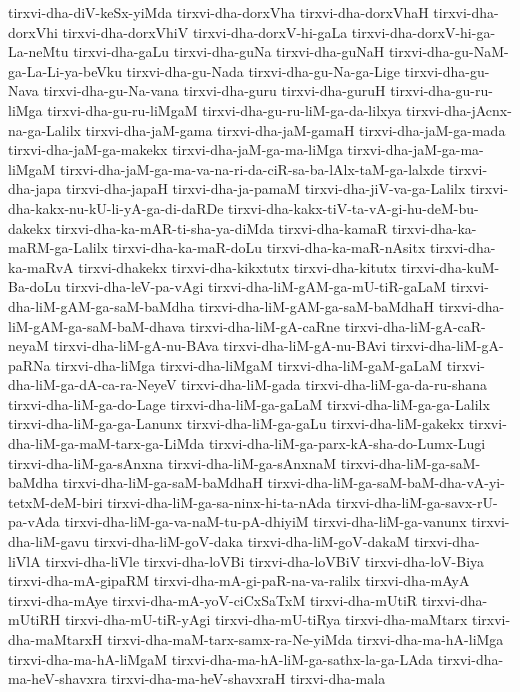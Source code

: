{tirxvi-dha-diV-keSx-yiMda
tirxvi-dha-dorxVha
tirxvi-dha-dorxVhaH
tirxvi-dha-dorxVhi
tirxvi-dha-dorxVhiV
tirxvi-dha-dorxV-hi-gaLa
tirxvi-dha-dorxV-hi-ga-La-neMtu
tirxvi-dha-gaLu
tirxvi-dha-guNa
tirxvi-dha-guNaH
tirxvi-dha-gu-NaM-ga-La-Li-ya-beVku
tirxvi-dha-gu-Nada
tirxvi-dha-gu-Na-ga-Lige
tirxvi-dha-gu-Nava
tirxvi-dha-gu-Na-vana
tirxvi-dha-guru
tirxvi-dha-guruH
tirxvi-dha-gu-ru-liMga
tirxvi-dha-gu-ru-liMgaM
tirxvi-dha-gu-ru-liM-ga-da-lilxya
tirxvi-dha-jAcnx-na-ga-Lalilx
tirxvi-dha-jaM-gama
tirxvi-dha-jaM-gamaH
tirxvi-dha-jaM-ga-mada
tirxvi-dha-jaM-ga-makekx
tirxvi-dha-jaM-ga-ma-liMga
tirxvi-dha-jaM-ga-ma-liMgaM
tirxvi-dha-jaM-ga-ma-va-na-ri-da-ciR-sa-ba-lAlx-taM-ga-lalxde
tirxvi-dha-japa
tirxvi-dha-japaH
tirxvi-dha-ja-pamaM
tirxvi-dha-jiV-va-ga-Lalilx
tirxvi-dha-kakx-nu-kU-li-yA-ga-di-daRDe
tirxvi-dha-kakx-tiV-ta-vA-gi-hu-deM-bu-dakekx
tirxvi-dha-ka-mAR-ti-sha-ya-diMda
tirxvi-dha-kamaR
tirxvi-dha-ka-maRM-ga-Lalilx
tirxvi-dha-ka-maR-doLu
tirxvi-dha-ka-maR-nAsitx
tirxvi-dha-ka-maRvA
tirxvi-dhakekx
tirxvi-dha-kikxtutx
tirxvi-dha-kitutx
tirxvi-dha-kuM-Ba-doLu
tirxvi-dha-leV-pa-vAgi
tirxvi-dha-liM-gAM-ga-mU-tiR-gaLaM
tirxvi-dha-liM-gAM-ga-saM-baMdha
tirxvi-dha-liM-gAM-ga-saM-baMdhaH
tirxvi-dha-liM-gAM-ga-saM-baM-dhava
tirxvi-dha-liM-gA-caRne
tirxvi-dha-liM-gA-caR-neyaM
tirxvi-dha-liM-gA-nu-BAva
tirxvi-dha-liM-gA-nu-BAvi
tirxvi-dha-liM-gA-paRNa
tirxvi-dha-liMga
tirxvi-dha-liMgaM
tirxvi-dha-liM-gaM-gaLaM
tirxvi-dha-liM-ga-dA-ca-ra-NeyeV
tirxvi-dha-liM-gada
tirxvi-dha-liM-ga-da-ru-shana
tirxvi-dha-liM-ga-do-Lage
tirxvi-dha-liM-ga-gaLaM
tirxvi-dha-liM-ga-ga-Lalilx
tirxvi-dha-liM-ga-ga-Lanunx
tirxvi-dha-liM-ga-gaLu
tirxvi-dha-liM-gakekx
tirxvi-dha-liM-ga-maM-tarx-ga-LiMda
tirxvi-dha-liM-ga-parx-kA-sha-do-Lumx-Lugi
tirxvi-dha-liM-ga-sAnxna
tirxvi-dha-liM-ga-sAnxnaM
tirxvi-dha-liM-ga-saM-baMdha
tirxvi-dha-liM-ga-saM-baMdhaH
tirxvi-dha-liM-ga-saM-baM-dha-vA-yi-tetxM-deM-biri
tirxvi-dha-liM-ga-sa-ninx-hi-ta-nAda
tirxvi-dha-liM-ga-savx-rU-pa-vAda
tirxvi-dha-liM-ga-va-naM-tu-pA-dhiyiM
tirxvi-dha-liM-ga-vanunx
tirxvi-dha-liM-gavu
tirxvi-dha-liM-goV-daka
tirxvi-dha-liM-goV-dakaM
tirxvi-dha-liVlA
tirxvi-dha-liVle
tirxvi-dha-loVBi
tirxvi-dha-loVBiV
tirxvi-dha-loV-Biya
tirxvi-dha-mA-gipaRM
tirxvi-dha-mA-gi-paR-na-va-ralilx
tirxvi-dha-mAyA
tirxvi-dha-mAye
tirxvi-dha-mA-yoV-ciCxSaTxM
tirxvi-dha-mUtiR
tirxvi-dha-mUtiRH
tirxvi-dha-mU-tiR-yAgi
tirxvi-dha-mU-tiRya
tirxvi-dha-maMtarx
tirxvi-dha-maMtarxH
tirxvi-dha-maM-tarx-samx-ra-Ne-yiMda
tirxvi-dha-ma-hA-liMga
tirxvi-dha-ma-hA-liMgaM
tirxvi-dha-ma-hA-liM-ga-sathx-la-ga-LAda
tirxvi-dha-ma-heV-shavxra
tirxvi-dha-ma-heV-shavxraH
tirxvi-dha-mala
}
